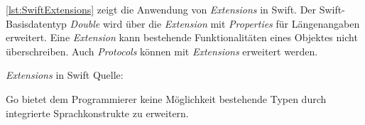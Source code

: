 \autoref{lst:SwiftExtensions} zeigt die Anwendung von \textit{Extensions} in Swift.
Der Swift-Basisdatentyp \textit{Double} wird über die \textit{Extension} mit \textit{Properties} für Längenangaben erweitert.
Eine \textit{Extension} kann bestehende Funktionalitäten eines Objektes nicht überschreiben.
Auch \textit{Protocols} können mit \textit{Extensions} erweitert werden.

\begin{listing}
\caption{\textit{Extensions} in Swift Quelle: \cite[S.332f]{Apple.2017}}
\label{lst:SwiftExtensions}
\end{listing}

Go bietet dem Programmierer keine Möglichkeit bestehende Typen durch integrierte Sprachkonstrukte zu erweitern. 